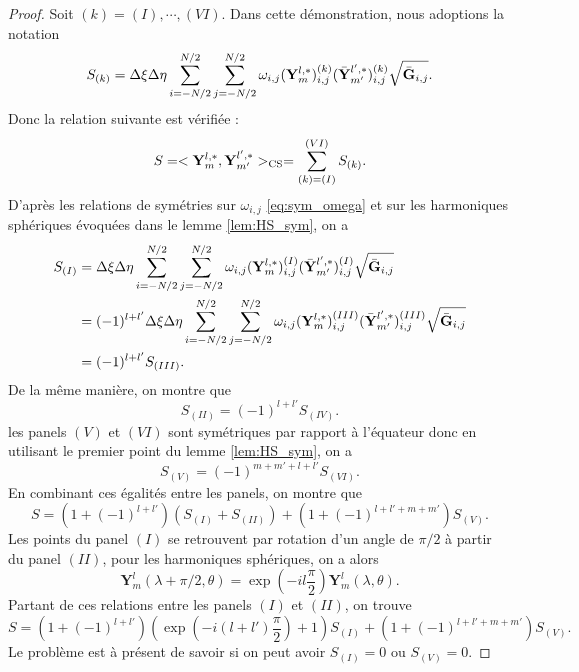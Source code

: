 \begin{proof}
Soit $(k) = (I) , \cdots, (VI)$. Dans cette démonstration, nous adoptions la notation
\begin{equation}
S_{(k)} = \Delta \xi \Delta \eta \displaystyle\sum\limits_{i=-N/2}^{N/2} \displaystyle\sum\limits_{j=-N/2}^{N/2} \omega_{i,j} (\mathbf{Y}_m^{l,*})_{i,j}^{(k)} (\bar{\mathbf{Y}}_{m'}^{l',*})_{i,j}^{(k)} \sqrt{\bar{\mathbf{G}}_{i,j}}.
\end{equation}
Donc la relation suivante est vérifiée :
\begin{equation}
S = <\mathbf{Y}_{m}^{l,*},\mathbf{Y}_{m'}^{l',*}>_{\text{CS}} = \displaystyle\sum\limits_{(k)=(I)}^{(VI)} S_{(k)}.
\end{equation}
D'après les relations de symétries sur $\omega_{i,j}$ \eqref{eq:sym_omega} et sur les harmoniques sphériques évoquées dans le lemme \ref{lem:HS_sym}, on a
\begin{align*}
S_{(I)} & = \Delta \xi \Delta \eta \displaystyle\sum\limits_{i=-N/2}^{N/2} \displaystyle\sum\limits_{j=-N/2}^{N/2} \omega_{i,j} (\mathbf{Y}_m^{l,*})_{i,j}^{(I)} (\bar{\mathbf{Y}}_{m'}^{l',*})_{i,j}^{(I)} \sqrt{\bar{\mathbf{G}}_{i,j}} \\
	& = (-1)^{l+l'} \Delta \xi \Delta \eta \displaystyle\sum\limits_{i=-N/2}^{N/2} \displaystyle\sum\limits_{j=-N/2}^{N/2} \omega_{i,j} (\mathbf{Y}_m^{l,*})_{i,j}^{(III)} (\bar{\mathbf{Y}}_{m'}^{l',*})_{i,j}^{(III)} \sqrt{\bar{\mathbf{G}}_{i,j}} \\
	& = (-1)^{l+l'}S_{(III)}.
\end{align*}
De la même manière, on montre que
\begin{equation}
S_{(II)} = (-1)^{l+l'}S_{(IV)}.
\end{equation}
les panels $(V)$ et $(VI)$ sont symétriques par rapport à l'équateur donc en utilisant le premier point du lemme \ref{lem:HS_sym}, on a
\begin{equation}
S_{(V)} = (-1)^{m+m'+l+l'} S_{(VI)}.
\end{equation}
En combinant ces égalités entre les panels, on montre que
\begin{equation}
S=(1+(-1)^{l+l'})(S_{(I)} + S_{(II)}) + (1+(-1)^{l+l'+m+m'})S_{(V)}.
\end{equation}
Les points du panel $(I)$ se retrouvent par rotation d'un angle de $\pi/2$ à partir du panel $(II)$, pour les harmoniques sphériques, on a alors
\begin{equation}
\mathbf{Y}^{l}_m(\lambda + \pi/2, \theta) = \exp \left( - i l \dfrac{\pi}{2}  \right) \mathbf{Y}^{l}_m(\lambda, \theta).
\end{equation}
Partant de ces relations entre les panels $(I)$ et $(II)$, on trouve
\begin{equation}
S = (1+(-1)^{l+l'})\left( \exp \left( -i(l+l') \dfrac{\pi}{2} \right) +1 \right)S_{(I)} + (1+(-1)^{l+l'+m+m'})S_{(V)}.
\end{equation}
Le problème est à présent de savoir si on peut avoir $S_{(I)}=0$ ou $S_{(V)} = 0$.


\end{proof}
